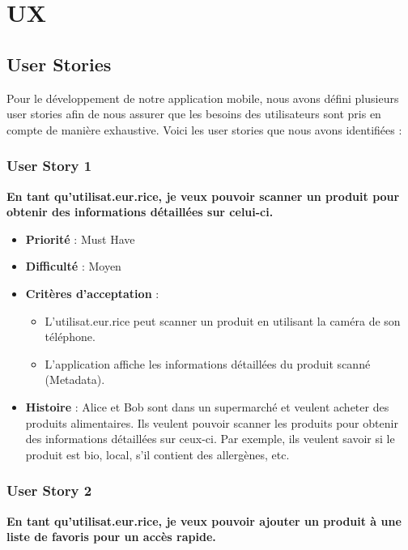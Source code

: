 \section{UX}

\subsection{User Stories}

Pour le développement de notre application mobile, nous avons défini plusieurs user stories afin de nous assurer que les besoins des utilisateurs sont pris en compte de manière exhaustive. Voici les user stories que nous avons identifiées :

\subsubsection{User Story 1}

\textbf{En tant qu'utilisat.eur.rice, je veux pouvoir scanner un produit pour obtenir des informations détaillées sur celui-ci.}

\begin{itemize}[noitemsep]
    \item \textbf{Priorité} : Must Have
    \item \textbf{Difficulté} : Moyen
    \item \textbf{Critères d'acceptation} :
          \begin{itemize}[noitemsep]
              \item L'utilisat.eur.rice peut scanner un produit en utilisant la caméra de son téléphone.
              \item L'application affiche les informations détaillées du produit scanné (Metadata).
          \end{itemize}
    \item \textbf{Histoire} : Alice et Bob sont dans un supermarché et veulent acheter des produits alimentaires. Ils veulent pouvoir scanner les produits pour obtenir des informations détaillées sur ceux-ci. Par exemple, ils veulent savoir si le produit est bio, local, s'il contient des allergènes, etc.
\end{itemize}

\subsubsection{User Story 2}

\textbf{En tant qu'utilisat.eur.rice, je veux pouvoir ajouter un produit à une liste de favoris pour un accès rapide.}


